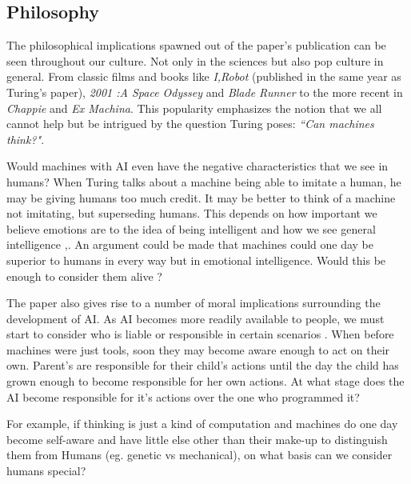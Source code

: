 \documentclass{scrartcl}
\begin{document}
\subsection{Philosophy}

The philosophical implications spawned out of the paper's publication can be seen throughout our culture. Not only in the sciences but also pop culture in general. From classic films and books like \textit{I,Robot} (published in the same year as Turing's paper), \textit{2001 :A Space Odyssey} and \textit{Blade Runner} to the more recent in \textit{Chappie} and \textit{Ex Machina}. This popularity emphasizes the notion that we all cannot help but be intrigued by the question Turing poses: \textit{\textquotedblleft Can machines think?"}. 

Would machines with AI even have the negative characteristics that we see in humans? When Turing talks about a machine being able to imitate a human, he may be giving humans too much credit. It may be better to think of a machine not imitating, but superseding humans. This depends on how important we believe emotions are to the idea of being intelligent and how we see general intelligence \cite{mccarthy1969some:14},\cite{brooks1999cambrian:15}. An argument could be made that machines could one day be superior to humans in every way but in emotional intelligence. Would this be enough to consider them alive \cite[p.21-32]{picard1997affective:16}? 

The paper also gives rise to a number of moral implications surrounding the development of AI. As AI becomes more readily available to people, we must start to consider who is liable or responsible in certain scenarios \cite[p84-91]{kaplan2015humans:17}. When before machines were just tools, soon they may become aware enough to act on their own. Parent's are responsible for their child's actions until the day the child has grown enough to become responsible for her own actions. At what stage does the AI become responsible for it's actions over the one who programmed it?

For example, if thinking is just a kind of computation \cite{pinker2003mind:18} and machines do one day become self-aware and have little else other than their make-up to distinguish them from Humans (eg. genetic vs mechanical), on what basis can we consider humans special?
\end{document}
